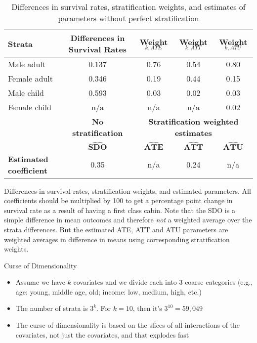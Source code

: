 \documentclass{beamer}
\begin{document}
\begin{frame}

\begin{table}\tiny{}
\caption{Differences in survival rates, stratification weights, and estimates of parameters without perfect stratification}
\centering
\begin{threeparttable}
\begin{tabular}{lc|ccc}
\toprule
\multicolumn{1}{l}{\textbf{Strata}}&
\multicolumn{1}{c}{\textbf{Differences in Survival Rates}}&
\multicolumn{1}{c}{\textbf{Weight$_{k,ATE}$}}&
\multicolumn{1}{c}{\textbf{Weight$_{k,ATT}$}}&
\multicolumn{1}{c}{\textbf{Weight$_{k,ATU}$}}\\
\midrule
Male adult		& 0.137 	&	0.76 &	0.54	&0.80	\\
Female adult	& 0.346 	&	0.19 &	0.44	&0.15	\\
Male child		& 0.593 	&	0.03 &	0.02	&0.03	\\
Female child	& n/a 	&	n/a 	&	n/a	&0.02	\\
\midrule
\multicolumn{1}{l}{\textbf{}}&
\multicolumn{1}{c}{\textbf{No stratification}}&
\multicolumn{3}{c}{\textbf{Stratification weighted estimates}}\\

 & $\widehat{\textbf{SDO}}$& $\widehat{\textbf{ATE}}$ & $\widehat{\textbf{ATT}}$ & $\widehat{\textbf{ATU}}$ \\
\midrule
\textbf{Estimated coefficient}& 0.35 & n/a & 	0.24	 & n/a  \\
\bottomrule
\end{tabular}
\begin{tablenotes}
\tiny
\item 
Differences in survival rates, stratification weights, and estimated parameters. All coefficients should be multiplied by 100 to get a percentage point change in survival rate as a result of having a first class cabin. Note that the SDO is a simple difference in mean outcomes and therefore \emph{not} a weighted average over the strata differences.  But the estimated ATE, ATT and ATU parameters are weighted averages in difference in means using corresponding stratification weights. 
\end{tablenotes}
\end{threeparttable}
\label{tab:titanic-weights2}
\end{table}


\end{frame}

\begin{frame}{Curse of Dimensionality}
	
	\begin{itemize}
	\item Assume we have $k$ covariates and we divide each into 3 coarse categories (e.g., age: young, middle age, old; income: low, medium, high, etc.)
	\item The number of strata is $3^k$. For $k=10$, then it's $3^{10}=59,049$
	\item The curse of dimensionality is based on the slices of all interactions of the covariates, not just the covariates, and that explodes fast
	\end{itemize}
\end{frame}
\end{document}
